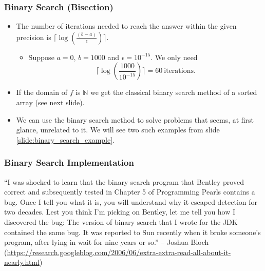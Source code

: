 \documentclass{beamer}
\begin{document}
\begin{frame}%
\frametitle{Binary Search (Bisection)}

\begin{itemize}

\item The number of iterations needed to reach the answer within the given precision is $\lceil\log(\frac{(b - a)}{\epsilon})\rceil$.
\begin{itemize}
\item<1-> Suppose $a = 0$, $b = 1000$ and $\epsilon = 10^{-15}$. We only need
$$
\lceil\log(\frac{1000}{10^{-15}})\rceil = 60 \ \textrm{iterations}.
$$
\end{itemize}


\item<2-> If the domain of $f$ is $\mathbb{N}$ we get the classical binary search method of a sorted array (see next slide).

\vspace{0.2cm}

\item<3-> We can use the binary search method to solve problems that seems, at first glance,
unrelated to it. We will see two such examples from slide \ref{slide:binary_search_example}.

\end{itemize}

\end{frame}

\begin{frame}%
\frametitle{Binary Search Implementation}

\footnotesize

\begin{mdframed}[style=exampledefault]
``I was shocked to learn that the binary search program that Bentley proved correct and subsequently
tested in Chapter 5 of Programming Pearls contains a bug.
Once I tell you what it is, you will understand why it escaped detection for two decades. Lest you think I'm picking on Bentley, let me
tell you how I discovered the bug: The version of binary search that I wrote for the
JDK contained the same bug. It was reported to Sun recently when it broke someone's program, after lying
in wait for nine years or so.'' -- Joshua Bloch (\url{https://research.googleblog.com/2006/06/extra-extra-read-all-about-it-nearly.html})
\end{mdframed}

\end{frame}
\end{document}
